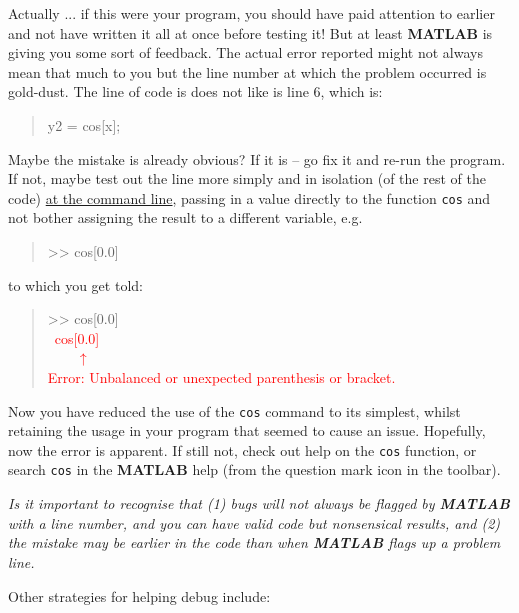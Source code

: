 \documentclass{tufte-book} %
\newenvironment{docspec}{\begin{quotation}\ttfamily\parskip0pt\parindent0pt\ignorespaces}{\end{quotation}}
\begin{document}
\noindent Actually ... if this were your program, you should have paid attention to earlier and not have written it all at once before testing it! But at least \textbf{MATLAB} is giving you some sort of feedback. The actual error reported might not always mean that much to you but the line number at which the problem occurred is gold-dust. The line of code is does not like is line 6, which is:

\begin{docspec}
y2 = cos[x];
\end{docspec} 

\noindent Maybe the mistake is already obvious? If it is -- go fix it and re-run the program. If not, maybe test out the line more simply and in isolation (of the rest of the code) \uline{at the command line}, passing in a value directly to the function \texttt{cos} and not bother assigning the result to a different variable, e.g.

\begin{docspec}
>> cos[0.0]
\end{docspec} 

\noindent to which you get told:

\begin{docspec}
>> cos[0.0]
\textcolor{red}{\\ \ cos[0.0]
\\ \ \ \ \ \(\uparrow\)
\\Error: Unbalanced or unexpected parenthesis or bracket.}
\end{docspec} 

\noindent Now you have reduced the use of the \texttt{\texttt{cos}} command to its simplest, whilst retaining the usage in your program that seemed to cause an issue. Hopefully, now the error is apparent. If still not, check out help on the \texttt{cos} function, or search \texttt{cos} in the \textbf{MATLAB} help (from the question mark icon in the toolbar).

\textit{Is it important to recognise that (1) bugs will not always be flagged by \textbf{MATLAB} with a line number, and you can have valid code but nonsensical results, and (2) the mistake may be earlier in the code than when \textbf{MATLAB} flags up a problem line.} 

\vspace{1mm}
Other strategies for helping debug include:
\end{document}
